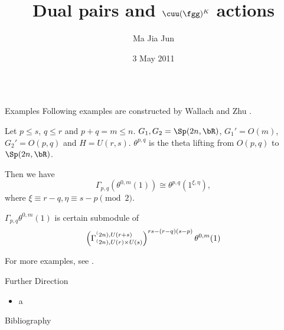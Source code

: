 \documentclass[final,hyperref={pdfpagelabels=false}]{beamer} %
\title[$\cuu(\fgg)^K$ actions]{Dual pairs and $\cuu(\fgg)^K$ actions}
\author[Ma]{Ma Jia Jun}
\institute[NUS]{National University of Singapore}
\date{3 May 2011}
\begin{document}
  \begin{frame}
  \begin{columns}
  \begin{column}{.49\textwidth}

    \begin{block}
    \end{block}

\begin{block}{Examples}
       Following examples are constructed by Wallach and Zhu \cite{WallachZhu2004}.

Let $p\leq s$, $q\leq r$ and
$p+q=m\leq n$. 
$G_1,G_2 = \Sp(2n,\bR)$, $G_1' = O(m)$, $G_2'=O(p,q)$ and
$H = U(r,s)$.
$\theta^{p,q}$ is the theta lifting from $O(p,q)$ to $\Sp(2n,\bR)$.

Then we have
\[
\Gamma_{p,q}(\theta^{0,m}(1)) \cong \theta^{p,q}(1^{\xi,\eta}),
\]
where $\xi \equiv r-q, \eta\equiv s-p \pmod{2}$.


$\Gamma_{p,q}\theta^{0,m}(1)$ is certain submodule of 
\[
\left(\Gamma_{\sp(2n),U(r)\times U(s)}^{\sp(2n), U(r+s)}\right)^{rs-(r-q)(s-p)}\theta^{0,m}(1)
\]
 

For more examples, see \cite{Enright1985}.
     \end{block}
 
     \begin{block}{Further Direction}
       \begin{minipage}{\textwidth}
         \begin{itemize}
           \item a
         \end{itemize}
       \end{minipage}
     \end{block}

     \begin{block}{\small Bibliography}
       \small
       {}
       
     \end{block}
   \end{column}
 \end{columns}
\end{frame}
\end{document}
